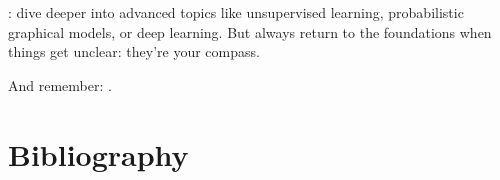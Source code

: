 \documentclass[letterpaper,10pt,english]{jupyterBook}
\begin{document}
\sphinxAtStartPar
{}: dive deeper into advanced topics like unsupervised learning, probabilistic graphical models, or deep learning. But always return to the foundations when things get unclear: they’re your compass.

\sphinxAtStartPar
And remember: .

\sphinxstepscope


\chapter{Bibliography}
\label{\detokenize{bibliography:bibliography}}\label{\detokenize{bibliography::doc}}






\renewcommand{\indexname}{Index}
\printindex
\end{document}
